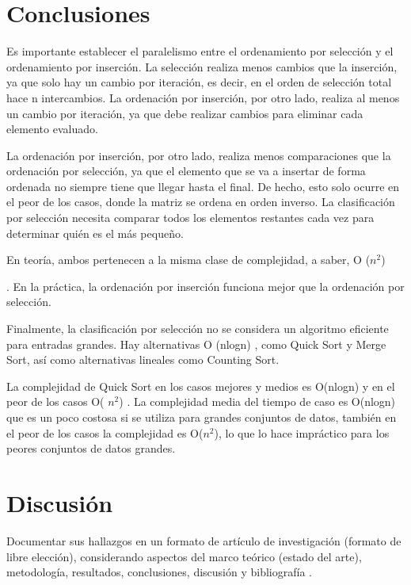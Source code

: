 \documentclass[a4paper]{article}
\begin{document}
\section{Conclusiones}
Es importante establecer el paralelismo entre el ordenamiento por selección y el ordenamiento por inserción. La selección realiza menos cambios que la inserción, ya que solo hay un cambio por iteración, es decir, en el orden de selección total hace n
intercambios. La ordenación por inserción, por otro lado, realiza al menos un cambio por iteración, ya que debe realizar cambios para eliminar cada elemento evaluado.

La ordenación por inserción, por otro lado, realiza menos comparaciones que la ordenación por selección, ya que el elemento que se va a insertar de forma ordenada no siempre tiene que llegar hasta el final. De hecho, esto solo ocurre en el peor de los casos, donde la matriz se ordena en orden inverso. La clasificación por selección necesita comparar todos los elementos restantes cada vez para determinar quién es el más pequeño.

En teoría, ambos pertenecen a la misma clase de complejidad, a saber, O ($n^{2}$)

. En la práctica, la ordenación por inserción funciona mejor que la ordenación por selección.

Finalmente, la clasificación por selección no se considera un algoritmo eficiente para entradas grandes. Hay alternativas O (nlogn)
, como Quick Sort y Merge Sort, así como alternativas lineales como Counting Sort. 

\cite{rin}

La complejidad de Quick Sort en los casos mejores y medios  es O(nlogn) y en el peor de los casos O( $n^{2}$)  . La complejidad media del tiempo de caso es O(nlogn) que es un poco costosa si se utiliza para grandes conjuntos de datos, también en el peor de los casos la complejidad es O($n^{2}$), lo que lo hace impráctico para los peores conjuntos de datos grandes.

\section{Discusión}



Documentar sus hallazgos en un formato de artículo de investigación (formato de libre elección), considerando
aspectos del marco teórico (estado del arte), metodología, resultados, conclusiones, discusión y bibliografía \cite{fager}.



\end{document}
